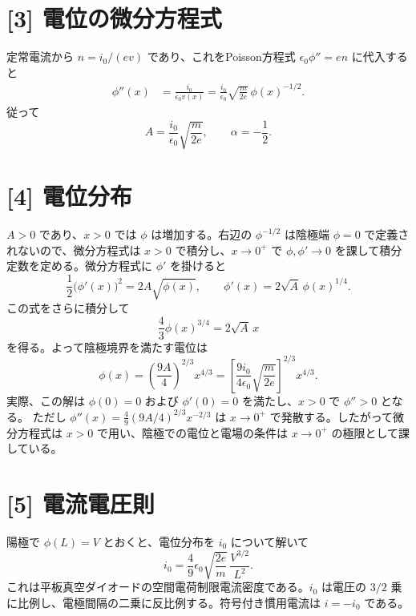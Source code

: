 \documentclass[11pt,a4paper]{article}
\begin{document}
\section*{[3] 電位の微分方程式}
定常電流から $n=i_0/(ev)$ であり、これをPoisson方程式 $\epsilon_0\phi''=en$ に代入すると
\begin{align}
  \phi''(x)
  &=\frac{i_0}{\epsilon_0 v(x)}
   =\frac{i_0}{\epsilon_0}\sqrt{\frac{m}{2e}}\,\phi(x)^{-1/2}.
\end{align}
従って
\begin{equation}
  \boxed{A=\frac{i_0}{\epsilon_0}\sqrt{\frac{m}{2e}},\qquad \alpha=-\frac12.}
\end{equation}

\section*{[4] 電位分布}
$A>0$ であり、$x>0$ では $\phi$ は増加する。右辺の $\phi^{-1/2}$ は陰極端 $\phi=0$ で定義されないので、微分方程式は $x>0$ で積分し、$x\to0^+$ で $\phi,\phi'\to0$ を課して積分定数を定める。微分方程式に $\phi'$ を掛けると
\begin{equation}
  \frac12\bigl(\phi'(x)\bigr)^2
  =2A\sqrt{\phi(x)},\qquad
  \phi'(x)=2\sqrt{A}\,\phi(x)^{1/4}.
\end{equation}
この式をさらに積分して
\begin{equation}
  \frac43\phi(x)^{3/4}=2\sqrt{A}\,x
\end{equation}
を得る。よって陰極境界を満たす電位は
\begin{equation}
  \boxed{\phi(x)=\left(\frac{9A}{4}\right)^{2/3}x^{4/3}
  =\left[\frac{9i_0}{4\epsilon_0}\sqrt{\frac{m}{2e}}\right]^{2/3}x^{4/3}.}
\end{equation}
実際、この解は $\phi(0)=0$ および $\phi'(0)=0$ を満たし、$x>0$ で $\phi''>0$ となる。
ただし $\phi''(x)=\frac49(9A/4)^{2/3}x^{-2/3}$ は $x\to0^+$ で発散する。したがって微分方程式は $x>0$ で用い、陰極での電位と電場の条件は $x\to0^+$ の極限として課している。

\section*{[5] 電流電圧則}
陽極で $\phi(L)=V$ とおくと、電位分布を $i_0$ について解いて
\begin{equation}
  \boxed{i_0=\frac49\epsilon_0\sqrt{\frac{2e}{m}}\,
    \frac{V^{3/2}}{L^2}.}
\end{equation}
これは平板真空ダイオードの空間電荷制限電流密度である。$i_0$ は電圧の $3/2$ 乗に比例し、電極間隔の二乗に反比例する。符号付き慣用電流は $i=-i_0$ である。
\end{document}
